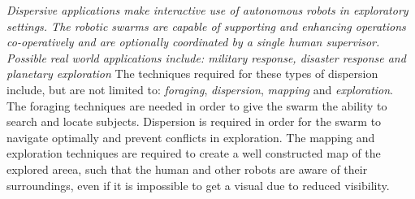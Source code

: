 
  \emph{Dispersive applications make interactive use of autonomous robots in exploratory settings. The robotic swarms are capable of supporting and enhancing operations co-operatively and are optionally coordinated by a single human supervisor. Possible real world applications include: military response, disaster response and planetary exploration}\cite{ludwig2006robotic,Penders2011}
    The techniques required for these types of dispersion include, but are not limited to: \emph{foraging}, \emph{dispersion}, \emph{mapping}  and \emph{exploration}.\cite{morlok2007dispersing,Penders2011,mclurkin2007distributed} The foraging techniques are needed in order to give the swarm the ability to search and locate subjects. Dispersion is required in order for the swarm to navigate optimally and prevent conflicts in exploration. The mapping and exploration techniques are required to create a well constructed map of the explored areea, such that the human and other robots are aware of their surroundings, even if it is impossible to get a visual due to reduced visibility.\cite{morlok2007dispersing}
    